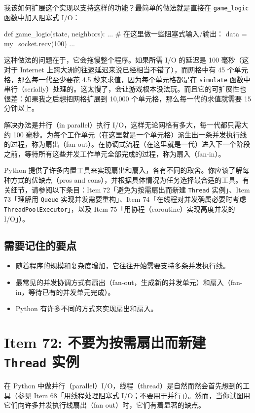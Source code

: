 我该如何扩展这个实现以支持这样的功能？最简单的做法就是直接在 \texttt{game\_logic} 函数中加入阻塞式 I/O：

\begin{codebox}[python]
def game_logic(state, neighbors):
    ...
    # 在这里做一些阻塞式输入/输出：
    data = my_socket.recv(100)
    ...
\end{codebox}

这种做法的问题在于，它会拖慢整个程序。如果所需 I/O 的延迟是 100 毫秒（这对于 Internet 上跨大洲的往返延迟来说已经相当不错了），而网格中有 45 个单元格，那么每一代至少要花 4.5 秒来求值，因为每个单元格都是在 \texttt{simulate} 函数中串行（serially）处理的。这太慢了，会让游戏根本没法玩。而且它的可扩展性也很差：如果我之后想把网格扩展到 10,000 个单元格，那么每一代的求值就需要 15 分钟以上。

解决办法是并行（in parallel）执行 I/O，这样无论网格有多大，每一代都只需大约 100 毫秒。为每个工作单元（在这里就是一个单元格）派生出一条并发执行线的过程，称为扇出（fan-out）。在协调式流程（在这里就是一代）进入下一个阶段之前，等待所有这些并发工作单元全部完成的过程，称为扇入（fan-in）。

Python 提供了许多内置工具来实现扇出和扇入，各有不同的取舍。你应该了解每种方式的优缺点（pros and cons），并根据具体情况为任务选择最合适的工具。有关细节，请参阅以下条目：Item 72「避免为按需扇出而新建 \texttt{Thread} 实例」、Item 73「理解用 \texttt{Queue} 实现并发需要重构」、Item 74「在线程对并发确属必要时考虑 \texttt{ThreadPoolExecutor}」，以及 Item 75「用协程（coroutine）实现高度并发的 I/O」）。

\subsection{需要记住的要点}

\begin{itemize}
\item 随着程序的规模和复杂度增加，它往往开始需要支持多条并发执行线。
\item 最常见的并发协调方式有扇出（fan-out，生成新的并发单元）和扇入（fan-in，等待已有的并发单元完成）。
\item Python 有许多不同的方式来实现扇出和扇入。
\end{itemize}

\section{Item 72: 不要为按需扇出而新建 \texttt{Thread} 实例}

在 Python 中做并行（parallel）I/O，线程（thread）是自然而然会首先想到的工具（参见 Item 68「用线程处理阻塞式 I/O；不要用于并行」）。然而，当你试图用它们向许多并发执行线扇出（fan out）时，它们有着显著的缺点。

